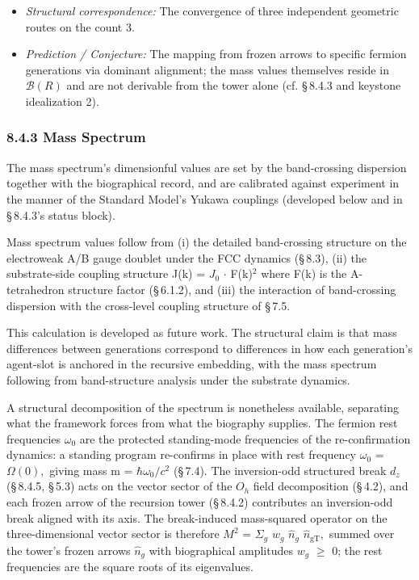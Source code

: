 \documentclass[11pt,oneside]{report}
\theoremstyle{definition}
\theoremstyle{remark}
\begin{document}
\begin{itemize}
\item
  \emph{Structural correspondence:} The convergence of three independent
  geometric routes on the count 3.
\end{itemize}

\begin{itemize}
\item
  \emph{Prediction / Conjecture:} The mapping from frozen arrows to
  specific fermion generations via dominant alignment; the mass values
  themselves reside in \ensuremath{\mathcal{B}(R)} and are not derivable from the tower alone
  (cf. \S\,8.4.3 and keystone idealization 2).
\end{itemize}

\subsubsection*{8.4.3 Mass Spectrum}

The mass spectrum's dimensionful values are set by the band-crossing
dispersion together with the biographical record, and are calibrated
against experiment in the manner of the Standard Model's Yukawa
couplings (developed below and in \S\,8.4.3's status block).

Mass spectrum values follow from (i) the detailed band-crossing structure
on the electroweak A/B gauge doublet under the FCC dynamics (\S\,8.3),
(ii) the substrate-side coupling structure J(k) = \ensuremath{J_{0}} \ensuremath{\cdot}
\textbar F(k)\textbar\ensuremath{^{2}} where F(k) is the A-tetrahedron structure factor
(\S\,6.1.2), and (iii) the interaction of band-crossing dispersion with the
cross-level coupling structure of \S\,7.5.

This calculation is developed as future work. The structural claim is
that mass differences between generations correspond to differences in
how each generation's agent-slot is anchored in the recursive embedding,
with the mass spectrum following from band-structure analysis under the
substrate dynamics.

A structural decomposition of the spectrum is nonetheless available,
separating what the framework forces from what the biography supplies.
The fermion rest frequencies \ensuremath{\omega_{0}} are the protected standing-mode
frequencies of the re-confirmation dynamics: a standing program
re-confirms in place with rest frequency \ensuremath{\omega_{0}} = \ensuremath{\Omega (0),} giving mass m =
\ensuremath{\hbar \omega_{0}/c^{2}} (\S\,7.4). The inversion-odd structured break \ensuremath{d_{z}} (\S\,8.4.5, \S\,5.3)
acts on the vector sector of the \ensuremath{O_{h}} field decomposition (\S\,4.2), and
each frozen arrow of the recursion tower (\S\,8.4.2) contributes an
inversion-odd break aligned with its axis. The break-induced
mass-squared operator on the three-dimensional vector sector is
therefore \ensuremath{M^{2}} = \ensuremath{\Sigma_{g}} \ensuremath{w_{g}} \ensuremath{\hat{n}_{g}} \ensuremath{\hat{n}_{\mathrm{gT}},} summed over the tower's frozen
arrows \ensuremath{\hat{n}_{g}} with biographical amplitudes \ensuremath{w_{g}} \ensuremath{\geq} 0; the rest frequencies
are the square roots of its eigenvalues.
\end{document}
